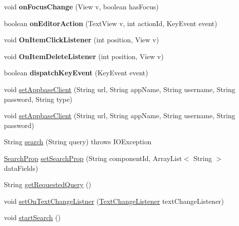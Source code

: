 \begin{DoxyCompactItemize}
void {\bfseries on\+Focus\+Change} (View v, boolean has\+Focus)
\item 
\mbox{\label{classcom_1_1example_1_1searchwidget_1_1_search_bar_a2475a3f619ffe2b0d010e4c14a0a1025}} 
boolean {\bfseries on\+Editor\+Action} (Text\+View v, int action\+Id, Key\+Event event)
\item 
\mbox{\label{classcom_1_1example_1_1searchwidget_1_1_search_bar_a8ed52376e01a1777559c5dc1f5d3a695}} 
void {\bfseries On\+Item\+Click\+Listener} (int position, View v)
\item 
\mbox{\label{classcom_1_1example_1_1searchwidget_1_1_search_bar_aa5cf65345d66fd669f0af9de500005cc}} 
void {\bfseries On\+Item\+Delete\+Listener} (int position, View v)
\item 
\mbox{\label{classcom_1_1example_1_1searchwidget_1_1_search_bar_aee224a53845c6480afcf0589aabbf2e8}} 
boolean {\bfseries dispatch\+Key\+Event} (Key\+Event event)
\item 
void \mbox{\hyperlink{classcom_1_1example_1_1searchwidget_1_1_search_bar_aeee8a868bca0435ece56efb35e84602d}{set\+Appbase\+Client}} (String url, String app\+Name, String username, String password, String type)
\item 
void \mbox{\hyperlink{classcom_1_1example_1_1searchwidget_1_1_search_bar_a4a4eddac44d1c06f0ac24e31dd653a79}{set\+Appbase\+Client}} (String url, String app\+Name, String username, String password)
\item 
String \mbox{\hyperlink{classcom_1_1example_1_1searchwidget_1_1_search_bar_a3ccff2a33e4f3bba007aa04840265b47}{search}} (String query)  throws I\+O\+Exception 
\item 
\mbox{\hyperlink{classcom_1_1example_1_1searchwidget_1_1_builder_1_1_search_prop}{Search\+Prop}} \mbox{\hyperlink{classcom_1_1example_1_1searchwidget_1_1_search_bar_a4adb569b19b3f944775531927ab378cf}{set\+Search\+Prop}} (String component\+Id, Array\+List$<$ String $>$ data\+Fields)
\item 
String \mbox{\hyperlink{classcom_1_1example_1_1searchwidget_1_1_search_bar_a4e9189e7948cfa925689c3aea179b3a5}{get\+Requested\+Query}} ()
\item 
void \mbox{\hyperlink{classcom_1_1example_1_1searchwidget_1_1_search_bar_afe1c0fa7bdb6574a8c22229de073fa2f}{set\+On\+Text\+Change\+Listner}} (\mbox{\hyperlink{interfacecom_1_1example_1_1searchwidget_1_1_search_bar_1_1_text_change_listener}{Text\+Change\+Listener}} text\+Change\+Listener)
\item 
void \mbox{\hyperlink{classcom_1_1example_1_1searchwidget_1_1_search_bar_a8cdd994a66ea763883b6d3ed89d2d299}{start\+Search}} ()
\end{DoxyCompactItemize}
